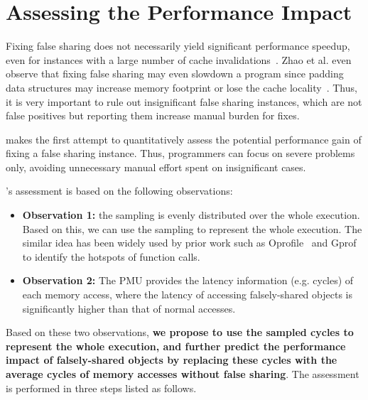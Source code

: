 \section{Assessing the Performance Impact}

\label{sec:predictimprove}
Fixing false sharing does not necessarily yield significant performance speedup, even for instances with a large number of cache invalidations~\cite{Sheriff, Predator}. Zhao et al. even observe that fixing false sharing may even slowdown a program since padding data structures may increase memory footprint or lose the cache locality~\cite{qinzhao}. Thus, it is very important to rule out insignificant false sharing instances, which are not false positives but reporting them increase manual burden for fixes.

\cheetah{} makes the first attempt to quantitatively assess the potential performance gain of fixing a false sharing instance. Thus, programmers can focus on severe problems only, avoiding unnecessary manual effort spent on insignificant cases.


\cheetah{}'s assessment is based on the following observations:

\begin{itemize}
\item {\bf Observation 1:} the sampling is evenly distributed over the whole execution. Based on this, we can use the sampling to represent the whole execution. The similar idea has been widely used by prior work such as Oprofile~\cite{oprofile} and Gprof~\cite{DBLP:conf/sigplan/GrahamKM82} to identify the hotspots of function calls.

\item {\bf Observation 2:} The PMU provides the latency information (e.g. cycles) of each memory access, where the latency of accessing falsely-shared objects is significantly higher than that of normal accesses. 

\end{itemize}

Based on these two observations, {\bf we propose to use the sampled cycles to represent the whole execution, and further predict the performance impact of falsely-shared objects by replacing these cycles with the average cycles of memory accesses without false sharing}. The assessment is performed in three steps listed as follows. 

